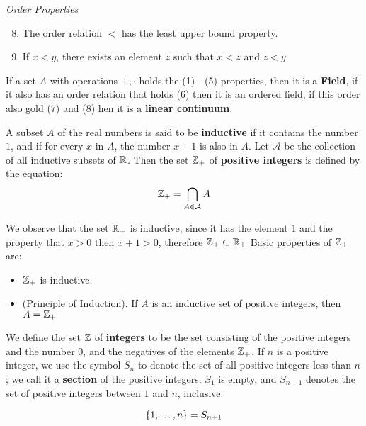 \textit{Order Properties}

\begin{enumerate}
	\setcounter{enumi}{7}
	\item The order relation $ < $ has the least upper bound property.
	\item If $ x < y $, there exists an element $ z $ such that $ x < z $ and $ z < y $
\end{enumerate}

If a set $ A $ with operations $ +, \cdot $ holds the (1) - (5) properties, then it is a \textbf{Field}, if it also has an order relation that holds (6) then it is an ordered field, if this order also gold (7) and (8) hen it is a \textbf{linear continuum}.

\begin{defn}
	A subset $ A $ of the real numbers is said to be \textbf{inductive} if it contains the number $ 1 $, and if for every $ x  $ in $ A $, the number $ x + 1 $ is also in $ A $. Let $ \mathcal{A} $ be the collection of all inductive subsets of $ \mathbb{R} $. Then the set $ \mathbb{Z}_+ $ of \textbf{positive integers} is defined by the equation:
	\[ \mathbb{Z}_+ = \bigcap_{A \in \mathcal{A}} A \]
\end{defn}
We observe that the set $ \mathbb{R}_+ $ is inductive, since it has the element $ 1 $ and the property that $  x > 0 $ then $ x + 1 > 0 $, therefore $ \mathbb{Z}_+ \subset \mathbb{R}_+ $
Basic properties of $ \mathbb{Z}_+ $ are:
\begin{itemize}
	\item $ \mathbb{Z}_+ $ is inductive.
	\item (Principle of Induction). If $ A $ is an inductive set of positive integers, then $ A = \mathbb{Z}_+ $
\end{itemize}
We define the set $ \mathbb{Z} $ of \textbf{integers} to be the set consisting of the positive integers and the number $ 0 $, and the negatives of the elements $ \mathbb{Z}_+ $. If $ n $ is a positive integer, we use the symbol $ S_n $ to denote the set of all positive integers less than $ n $; we call it a \textbf{section} of the positive integers. $ S_1 $ is empty, and $ S_{n+1} $ denotes the set of positive integers between $ 1 $ and $ n $, inclusive.

\[ \left\lbrace 1, \ldots, n \right\rbrace = S_{n+1} \]

